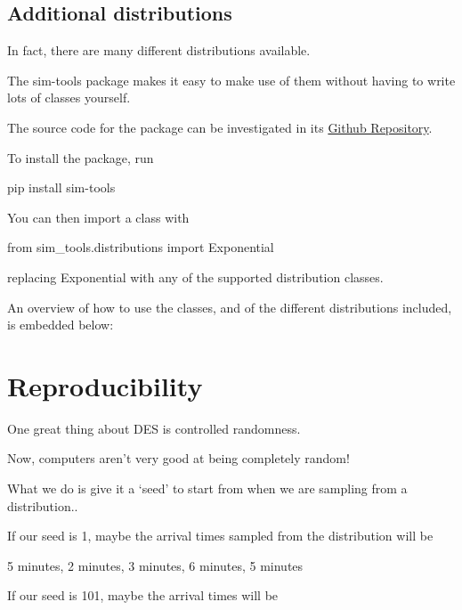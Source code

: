 \documentclass[
  letterpaper,
  DIV=11,
  numbers=noendperiod]{scrreprt}
\newenvironment{Shaded}{}{}
\newcommand{\ImportTok}[1]{\textcolor[rgb]{0.01,0.18,0.38}{#1}}
\newcommand{\NormalTok}[1]{\textcolor[rgb]{0.14,0.16,0.18}{#1}}
\newcommand{\OperatorTok}[1]{\textcolor[rgb]{0.14,0.16,0.18}{#1}}
\begin{document}
\section{Additional distributions}\label{additional-distributions}

In fact, there are many different distributions available.

The sim-tools package makes it easy to make use of them without having
to write lots of classes yourself.

The source code for the package can be investigated in its
\href{https://github.com/TomMonks/sim-tools}{Github Repository}.

To install the package, run

\begin{Shaded}
\begin{Highlighting}[]
\NormalTok{pip install sim}\OperatorTok{{-}}\NormalTok{tools}
\end{Highlighting}
\end{Shaded}

You can then import a class with

\begin{Shaded}
\begin{Highlighting}[]
\ImportTok{from}\NormalTok{ sim\_tools.distributions }\ImportTok{import}\NormalTok{ Exponential}
\end{Highlighting}
\end{Shaded}

replacing Exponential with any of the supported distribution classes.

An overview of how to use the classes, and of the different
distributions included, is embedded below:

\chapter{Reproducibility}\label{sec-reproducibility}

One great thing about DES is controlled randomness.

Now, computers aren't very good at being completely random!

What we do is give it a `seed' to start from when we are sampling from a
distribution..

If our seed is 1, maybe the arrival times sampled from the distribution
will be

5 minutes, 2 minutes, 3 minutes, 6 minutes, 5 minutes

If our seed is 101, maybe the arrival times will be
\end{document}
